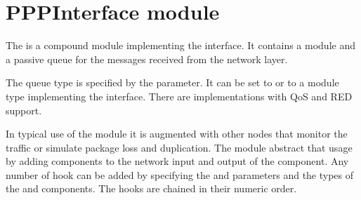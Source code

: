 

\section{PPPInterface module}

The  is a compound module implementing the 
interface. It contains a  module and a passive queue for the messages
received from the network layer.

The queue type is specified by the  parameter.
It can be set to  or to a module type implementing
the  interface. There are implementations
with QoS and RED support.

In typical use of the  module it is augmented with other nodes
that monitor the traffic or simulate package loss and duplication.
The  module abstract that usage by adding
 components to the network input and output of the
 component. Any number of hook can be added by
specifying the  and 
parameters and the types of the  and 
components. The hooks are chained in their numeric order.





